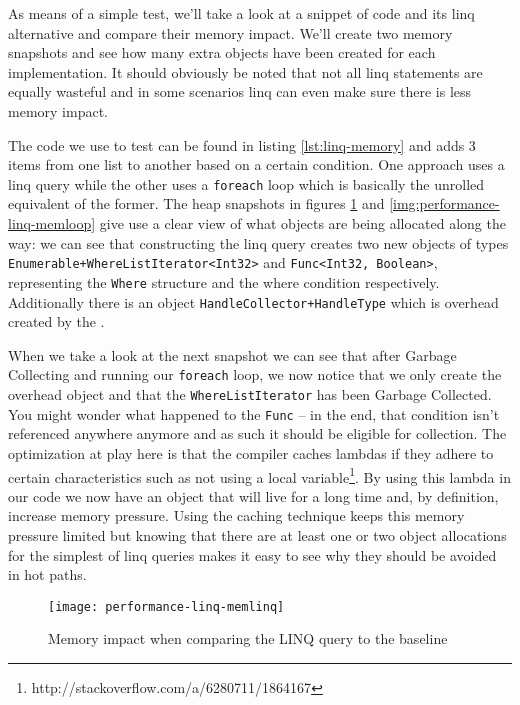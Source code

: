 As means of a simple test, we'll take a look at a snippet of code and its \gls{linq} alternative and compare their memory impact. We'll create two memory snapshots and see how many extra objects have been created for each implementation. It should obviously be noted that not all \gls{linq} statements are equally wasteful and in some scenarios \gls{linq} can even make sure there is less memory impact.

The code we use to test can be found in listing \ref{lst:linq-memory} and adds 3 items from one list to another based on a certain condition. One approach uses a \gls{linq} query while the other uses a \texttt{foreach} loop which is basically the unrolled equivalent of the former. The heap snapshots in figures \ref{img:performance-linq-memlinq} and \ref{img:performance-linq-memloop} give use a clear view of what objects are being allocated along the way: we can see that constructing the \gls{linq} query creates two new objects of types \texttt{Enumerable+WhereListIterator<Int32>} and \texttt{Func<Int32, Boolean>}, representing the \texttt{Where} structure and the where condition respectively. Additionally there is an object \texttt{HandleCollector+HandleType} which is overhead created by the . 

When we take a look at the next snapshot we can see that after Garbage Collecting and running our \texttt{foreach} loop, we now notice that we only create the overhead object and that the \texttt{WhereListIterator} has been Garbage Collected. You might wonder what happened to the \texttt{Func} -- in the end, that condition isn't referenced anywhere anymore and as such it should be eligible for collection. The optimization at play here is that the \gls{compiler} caches lambdas if they adhere to certain characteristics such as not using a local variable\footnote{http://stackoverflow.com/a/6280711/1864167}. By using this lambda in our code we now have an object that will live for a long time and, by definition, increase memory pressure. Using the caching technique keeps this memory pressure limited but knowing that there are at least one or two object allocations for the simplest of \gls{linq} queries makes it easy to see why they should be avoided in hot paths.


\begin{figure}
\centering
\texttt{[image: performance-linq-memlinq]}
\caption{Memory impact when comparing the LINQ query to the baseline}
\label{img:performance-linq-memlinq}
\end{figure}

